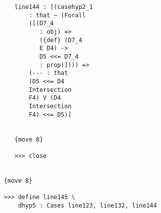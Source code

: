 \documentclass[12pt]{article}
\begin{document}
\begin{verbatim}
                           line144 : [(casehyp2_1 
                               : that ~ (Forall 
                               ([(D7_4 
                                  : obj) => 
                                  ({def} (D7_4 
                                  E D4) -> 
                                  D5 <<= D7_4 
                                  : prop)]))) => 
                               (--- : that 
                               (D5 <<= D4 
                               Intersection 
                               F4) V (D4 
                               Intersection 
                               F4) <<= D5)]


                           {move 8}

                           >>> close


                        {move 8}

                        >>> define line145 \
                            dhyp5 : Cases line123, line132, line144



\end{verbatim}
\end{document}
